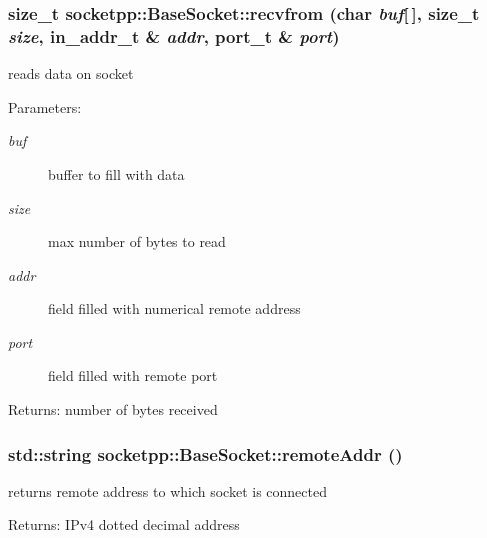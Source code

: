 \begin{CompactItemize}
{\subsubsection[{recvfrom}]{\setlength{\rightskip}{0pt plus 5cm}size\_\-t socketpp::BaseSocket::recvfrom (char {\em buf}\mbox{[}$\,$\mbox{]}, \/  size\_\-t {\em size}, \/  in\_\-addr\_\-t \& {\em addr}, \/  {\bf port\_\-t} \& {\em port})}}
\label{classsocketpp_1_1BaseSocket_11ebe50d7ae76c21ef55d38cb87cc700}


reads data on socket 

\begin{Desc}
\item[Parameters:]
\begin{description}
\item[{\em buf}]buffer to fill with data \item[{\em size}]max number of bytes to read \item[{\em addr}]field filled with numerical remote address \item[{\em port}]field filled with remote port \end{description}
\end{Desc}
\begin{Desc}
\item[Returns:]number of bytes received \end{Desc}
\hypertarget{classsocketpp_1_1BaseSocket_483c6186ae60d0c399983e14f55af600}{
\subsubsection[{remoteAddr}]{\setlength{\rightskip}{0pt plus 5cm}std::string socketpp::BaseSocket::remoteAddr ()}}
\label{classsocketpp_1_1BaseSocket_483c6186ae60d0c399983e14f55af600}


returns remote address to which socket is connected 

\begin{Desc}
\item[Returns:]IPv4 dotted decimal address \end{Desc}
\hypertarget{classsocketpp_1_1BaseSocket_039db642444d2111f2f58ebe032c5f5f}{
}
\end{CompactItemize}
